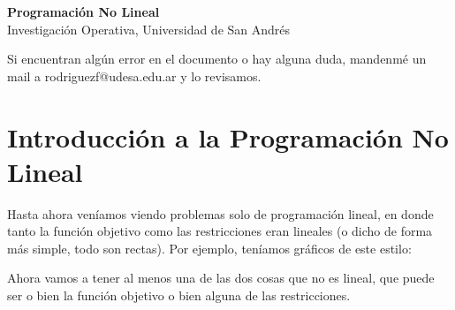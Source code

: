 \documentclass[12pt]{article}
\begin{document}
\begin{center}
  {\LARGE \textbf{Programación No Lineal}}\\[0.5em]
  {Investigación Operativa, Universidad de San Andrés}
\end{center}

Si encuentran algún error en el documento o hay alguna duda, mandenmé un mail a rodriguezf@udesa.edu.ar y lo revisamos.

\section{Introducción a la Programación No Lineal}

Hasta ahora veníamos viendo problemas solo de programación lineal, en donde tanto la función objetivo como las restricciones eran lineales (o dicho de forma más simple, todo son rectas). Por ejemplo, teníamos gráficos de este estilo:

\begin{center}
\end{center}

Ahora vamos a tener al menos una de las dos cosas que no es lineal, que puede ser o bien la función objetivo o bien alguna de las restricciones.
\end{document}
